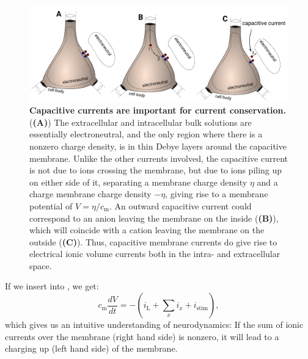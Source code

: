\begin{figure}[!ht]
\begin{center}
\includegraphics[width=1.0\textwidth]{Figures/Neuron/capacitive_currents.pdf}
\end{center}
\caption{\textbf{Capacitive currents are important for current  conservation.}   (\textbf{(A)}) The extracellular and intracellular bulk solutions are essentially electroneutral, and the only region where there is a nonzero charge density, is in thin Debye layers around the capacitive membrane. Unlike the other currents involved, the capacitive current is not due to ions crossing the membrane, but due to ions piling up on either side of it, separating a membrane charge density $\eta$ and a charge membrane charge density $-\eta$, giving rise to a membrane potential of $V = \eta/c_{\mathrm{m}}$.  An outward capacitive current could correspond to an anion leaving the membrane on the inside (\textbf{(B)}), which will coincide with a cation leaving the membrane on the outside (\textbf{(C)}). Thus, capacitive membrane currents do give rise to electrical ionic volume currents both in the intra- and extracellular space.
}
\label{fig:Neuron:capacitive_currents}
\end{figure}

If we insert  into , we get:
\begin{equation}
c_{\mathrm{m}} \frac{dV}{dt} = - (i_{\mathrm{L}} + \sum_x{i_x} +  i_{\mathrm{stim}}),
\label{eq:Neuron:singlecomp_capinserted}
\end{equation}
which gives us an intuitive understanding of neurodynamics: If the sum of ionic currents over the membrane (right hand side) is nonzero, it will lead to a charging up (left hand side) of the membrane. 


